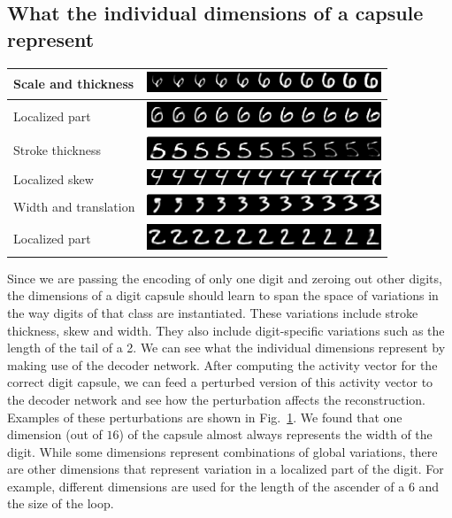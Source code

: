 \documentclass{article}
\begin{document}
\subsection{What the individual dimensions of a capsule represent}
\begin{table}[t]
\centering
{}
\label{dim-recons}
\begin{tabular}{m{4cm} | m{7cm}}
Scale and thickness & \includegraphics[width=7cm]{recons/dim6} \\ \hline
Localized part & \includegraphics[width=7cm]{recons/dim7} \\ \hline
Stroke thickness & \includegraphics[width=7cm]{recons/dim8} \\ \hline
Localized skew & \includegraphics[width=7cm]{recons/dim12} \\ \hline
Width and translation & \includegraphics[width=7cm]{recons/dim10} \\ \hline
Localized part & \includegraphics[width=7cm]{recons/dim11}
\end{tabular}
\end{table}
Since we are passing the encoding of only one digit and zeroing out other digits, the dimensions of a digit capsule should learn to span the space of variations in the way digits of that class are instantiated. These variations include stroke thickness, skew and width. They also include digit-specific variations such as the length of the tail of a 2. We can see what the individual dimensions represent by making use of the decoder network. After computing the activity vector for the correct digit capsule, we can feed a perturbed version of this activity vector to the decoder network and see how the perturbation affects the reconstruction. Examples of these perturbations are shown in Fig.~\ref{dim-recons}. We found that one dimension (out of $16$) of the capsule almost always represents the width of the digit. While some dimensions represent combinations of global variations, there are other dimensions that represent variation in a localized part of the digit. For example, different dimensions are used for the length of the ascender of a 6 and the size of the loop. 
\end{document}
